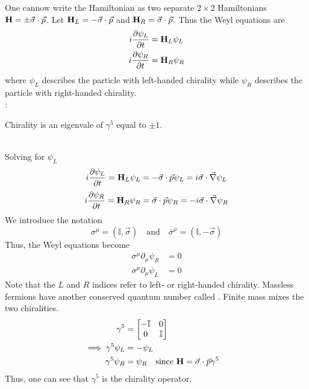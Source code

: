 \documentclass[12pt,a4paper,titlepage]{article}
\newcommand{\trm}[1]{\textrm{#1}} %
\newcommand{\ul}[1]{\underline{\smash{#1}}} %
\newcommand{\aside}[1]{%
	\ul{Aside}:\hfill
	\begin{minipage}[t]{\dimexpr\linewidth-8em\relax}
	#1
	\end{minipage}\hspace{4em}\bigskip
}
\begin{document}
One cannow write the Hamiltonian as two separate $2\times2$ Hamiltonians $\vb{H}=\pm \vec{\sigma}\cdot\vec{p}$. Let $\vb{H}_{L}=-\vec{\sigma}\cdot\vec{p}$ and $\vb{H}_{R}=\vec{\sigma}\cdot\vec{p}$. Thus the Weyl equations are
\begin{equation}
\begin{aligned}
i\pdv{\psi_{L}}{t}&=\vb{H}_{L}\psi_{L}\\
i\pdv{\psi_{R}}{t}&=\vb{H}_{R}\psi_{R}
\end{aligned}
\end{equation} 
where $\psi_{L}$ describes the particle with left-handed chirality while $\psi_{R}$ describes the particle with right-handed chirality.\\

\aside{Chirality is an eigenvale of $\gamma^{5}$ equal to $\pm1$.}\\

Solving for $\psi_{L}$
\begin{equation}
i\pdv{\psi_{L}}{t}=\vb{H}_{L}\psi_{L}=-\vec{\sigma}\cdot\vec{p}\psi_{L}=i\vec{\sigma}\cdot\vec{\nabla}\psi_{L}
\end{equation}
\begin{equation}
i\pdv{\psi_{R}}{t}=\vb{H}_{R}\psi_{R}=\vec{\sigma}\cdot\vec{p}\psi_{R}=-i\vec{\sigma}\cdot\vec{\nabla}\psi_{R}
\end{equation}
We introduce the notation
\begin{equation}
\sigma^{\mu}=(\mathbb{I},\vec{\sigma})\quad\trm{and}\quad\overline{\sigma}^{\mu}=(\mathbb{I},-\vec{\sigma})
\end{equation}
Thus, the Weyl equations become
\begin{equation}
\begin{aligned}
\sigma^{\mu}\partial_{\mu}\psi_{R}&=0\\
\overline{\sigma}^{\mu}\partial_{\mu}\psi_{L}&=0
\end{aligned}
\end{equation}
Note that the $L$ and $R$ indices refer to left- or right-handed chirality. Massless fermions have another conserved quantum number called \ul{chirality}. Finite mass mixes the two chiralities.
\begin{equation}
\begin{aligned}
\gamma^{5}&=\mqty[-\mathbb{I} & 0 \\ 0 & \mathbb{I}]\\
\implies \gamma^{5}\psi_{L}&=-\psi_{L}\\
\gamma^{5}\psi_{R}&=\psi_{R}\qq{since $\vb{H}=\vec{\sigma}\cdot\vec{p}\gamma^{5}$}
\end{aligned}
\end{equation}
Thus, one can see that $\gamma^{5}$ is the chirality operator.\\
\end{document}
